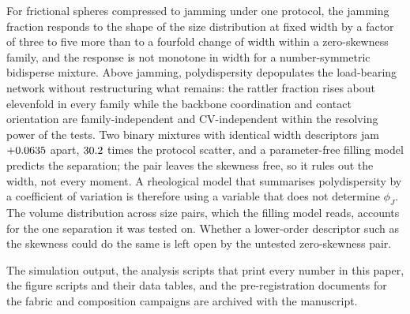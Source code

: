 \documentclass[reprint,aps,pre,amsmath,amssymb,superscriptaddress,longbibliography,nofootinbib,floatfix]{revtex4-2}
\newcommand{\phiJ}{\phi_{J}}
\newcommand{\CV}{\mathrm{CV}}
\begin{document}
For frictional spheres compressed to jamming under one protocol, the jamming fraction responds to the shape of the size distribution at fixed width by a factor of three to five more than to a fourfold change of width within a zero-skewness family, and the response is not monotone in width for a number-symmetric bidisperse mixture.
Above jamming, polydispersity depopulates the load-bearing network without restructuring what remains: the rattler fraction rises about elevenfold in every family while the backbone coordination and contact orientation are family-independent and $\CV$-independent within the resolving power of the tests.
Two binary mixtures with identical width descriptors jam $+0.0635$ apart, $30.2$ times the protocol scatter, and a parameter-free filling model predicts the separation; the pair leaves the skewness free, so it rules out the width, not every moment.
A rheological model that summarises polydispersity by a coefficient of variation is therefore using a variable that does not determine $\phiJ$.
The volume distribution across size pairs, which the filling model reads, accounts for the one separation it was tested on.
Whether a lower-order descriptor such as the skewness could do the same is left open by the untested zero-skewness pair.

\begin{acknowledgments}
The simulation output, the analysis scripts that print every number in this paper, the figure scripts and their data tables, and the pre-registration documents for the fabric and composition campaigns are archived with the manuscript.
\end{acknowledgments}


\end{document}
